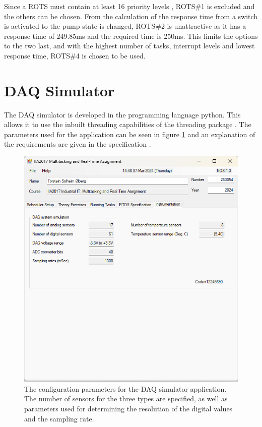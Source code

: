 \documentclass[12pt, A4paper, english]{book}
\begin{document}
Since a ROTS must contain at least 16 priority levels \cite{LN}, ROTS\#1 is excluded and the others can be chosen. From the calculation of the response time from a switch is activated to the pump state is changed, ROTS\#2 is unattractive as it has a response time of 249.85ms and the required time is 250ms. This limits the options to the two last, and with the highest number of tasks, interrupt levels and lowest response time, ROTS\#4 is chosen to be used.

		\section{DAQ Simulator}
The DAQ simulator is developed in the programming language python. This allows it to use the inbuilt threading capabilities of the threading package \cite{threading}. The parameters used for the application can be seen in figure \ref{im:DAQparams} and an explanation of the requirements are given in the specification \cite{task}.
			\begin{figure}
\centering
\includegraphics[width=\linewidth]{Parameters_4}
\caption{The configuration parameters for the DAQ simulator application. The number of sensors for the three types are specified, as well as parameters used for determining the resolution of the digital values and the sampling rate.}
\label{im:DAQparams}
			\end{figure}
\end{document}
